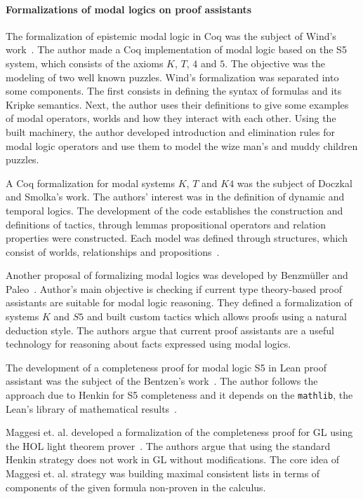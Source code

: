 \documentclass[sigconf]{acmart}
\begin{document}
\paragraph{Formalizations of modal logics on proof assistants}

The formalization of epistemic modal logic in Coq was the subject of Wind's
work~\cite{dewind}.
The author made a Coq implementation of modal logic based on the S5 system,
which consists of  the axioms $K$, $T$, $4$ and $5$. The objective was the
modeling of two well known puzzles.
Wind's formalization was separated into some components. The first consists in
defining the syntax of formulas and its Kripke semantics. Next, the author uses
their definitions to give some examples of modal operators, worlds and how they
interact with each other. Using the built machinery, the author developed
introduction and elimination rules for modal logic operators and use them to
model the wize man's and muddy children puzzles.

A Coq formalization for modal systems $K$, $T$ and $K4$ was the subject of 
Doczkal and Smolka's work. The authors' interest was in the definition of dynamic
and temporal logics. The development of the code establishes the construction
and definitions of tactics, through lemmas propositional operators and relation
properties were constructed. Each model was defined through structures, which
consist of worlds, relationships and propositions~\cite{saarland}.

Another proposal of formalizing modal logics was developed by Benzmüller and
Paleo~\cite{Chris_Bruno}. Author's main objective is checking if current
type theory-based proof assistants are suitable for modal logic reasoning.
They defined a formalization of systems $K$ and $S5$ and built custom tactics
which allows proofs using a natural deduction style.
The authors argue that current proof assistants are a useful technology for
reasoning about facts expressed using modal logics. 

The development of a completeness proof for modal logic S5 in Lean proof
assistant was the subject of the Bentzen's work~\cite{Bentzen2021}. The author
follows the approach due to Henkin for S5 completeness and it depends on
the \texttt{mathlib}, the Lean's library of mathematical results~\cite{mathlib20}. 

Maggesi et. al. developed a formalization of the completeness proof for GL using
the HOL light theorem prover~\cite{Maggesi21}. The authors argue that using the
standard Henkin strategy does not work in GL without modifications. The core idea of
Maggesi et. al. strategy was building maximal consistent lists in terms of
components of the given formula non-proven in the calculus.
\end{document}

